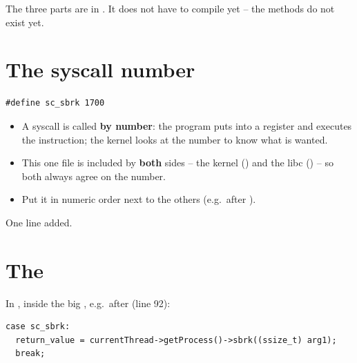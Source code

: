 \documentclass[11pt]{report}
\newcommand{\done}[1]{\begin{keybox}[title={Done when}]#1\end{keybox}}
\begin{document}
\done{The three parts are in . It does not have to compile yet -- the methods do
not exist yet.}

\section{The syscall number \hfill {\normalsize{}}}

\begin{lstlisting}[style=cpp]
#define sc_sbrk 1700
\end{lstlisting}

\begin{itemize}
  \item A syscall is called \textbf{by number}: the program puts  into a register and
        executes the  instruction; the kernel looks at the number to know what is wanted.
  \item This one file is included by \textbf{both} sides -- the kernel () and the libc
        () -- so both always agree on the number.
  \item Put it in numeric order next to the others (e.g.\ after ).
\end{itemize}

\done{One line added.}

\section{The  \hfill {\normalsize{}}}

In , inside the big , e.g.\ after  (line 92):

\begin{lstlisting}[style=cpp]
case sc_sbrk:
  return_value = currentThread->getProcess()->sbrk((ssize_t) arg1);
  break;
\end{lstlisting}
\end{document}
